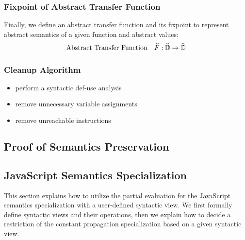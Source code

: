 \subsubsection{Fixpoint of Abstract Transfer Function} Finally, we define an
abstract transfer function and its fixpoint to represent abstract semantics of a
given function and abstract values:
\[
  \begin{array}{ll}
    \text{Abstract Transfer Function} & \widehat{F}: \widehat{\mathbb{D}} \rightarrow
    \widehat{\mathbb{D}}\\
\end{array}
\]

\todo

\subsubsection{Cleanup Algorithm}

\todo

\begin{itemize}
  \item perform a syntactic def-use analysis
  \item remove unnecessary variable assignments
  \item remove unreachable instructions
\end{itemize}


\subsection{Proof of Semantics Preservation}

\todo





\subsection{JavaScript Semantics Specialization}

This section explains how to utilize the partial evaluation for the JavaScript
semantics specialization with a user-defined syntactic view.  We first formally
define syntactic views and their operations, then we explain how to decide a
restriction of the constant propagation specialization based on a given
syntactic view.

